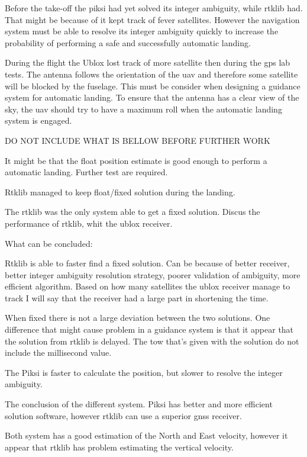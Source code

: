 Before the take-off the piksi had yet solved its integer ambiguity, while \gls{rtklib} had. That might be because of it kept track of fever satellites. However the navigation system must be able to resolve its integer ambiguity quickly to increase the probability of performing a safe and successfully automatic landing.

During the flight the Ublox lost track of more satellite then during the \gls{gps} lab tests. The antenna follows the orientation of the \gls{uav} and therefore some satellite will be blocked by the fuselage. This must be consider when designing a guidance system for automatic landing. To ensure that the antenna has a clear view of the sky, the \gls{uav} should try to have a maximum roll when the automatic landing system is engaged.







DO NOT INCLUDE WHAT IS BELLOW BEFORE FURTHER WORK


It might be that the float position estimate is good enough to perform a automatic landing. Further test are required.

Rtklib managed to keep float/fixed solution during the landing.

The rtklib was the only system able to get a fixed solution. Discus the performance of rtklib, whit the ublox receiver. 

What can be concluded:

Rtklib is able to faster find a fixed solution. Can be because of better receiver, better integer ambiguity resolution strategy, poorer validation of ambiguity, more efficient algorithm. Based on how many satellites the ublox receiver manage to track I will say that the receiver had a large part in shortening the time.

When fixed there is not a large deviation between the two solutions. One difference that might cause problem in a guidance system is that it appear that the solution from rtklib is delayed. The \gls{tow} that's given with the solution do not include the millisecond value. 

The Piksi is faster to calculate the position, but slower to resolve the integer ambiguity. 

The conclusion of the different system. Piksi has better and more efficient solution software, however rtklib can use a superior \gls{gnss} receiver.

Both system has a good estimation of the North and East velocity, however it appear that rtklib has problem estimating the vertical velocity.


